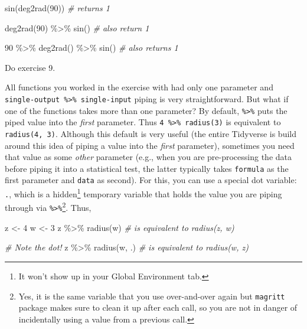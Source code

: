 \documentclass[
]{book}
\newenvironment{Shaded}{\begin{snugshade}}{\end{snugshade}}
\newcommand{\CommentTok}[1]{\textcolor[rgb]{0.56,0.35,0.01}{\textit{#1}}}
\newcommand{\DecValTok}[1]{\textcolor[rgb]{0.00,0.00,0.81}{#1}}
\newcommand{\FunctionTok}[1]{\textcolor[rgb]{0.00,0.00,0.00}{#1}}
\newcommand{\NormalTok}[1]{#1}
\newcommand{\OtherTok}[1]{\textcolor[rgb]{0.56,0.35,0.01}{#1}}
\newcommand{\SpecialCharTok}[1]{\textcolor[rgb]{0.00,0.00,0.00}{#1}}
\begin{document}
\begin{Shaded}
\begin{Highlighting}[]
\FunctionTok{sin}\NormalTok{(}\FunctionTok{deg2rad}\NormalTok{(}\DecValTok{90}\NormalTok{)) }\CommentTok{\# returns 1}

\FunctionTok{deg2rad}\NormalTok{(}\DecValTok{90}\NormalTok{) }\SpecialCharTok{\%\textgreater{}\%} \FunctionTok{sin}\NormalTok{() }\CommentTok{\# also return 1}

\DecValTok{90} \SpecialCharTok{\%\textgreater{}\%} \FunctionTok{deg2rad}\NormalTok{() }\SpecialCharTok{\%\textgreater{}\%} \FunctionTok{sin}\NormalTok{() }\CommentTok{\# also returns 1}
\end{Highlighting}
\end{Shaded}

Do exercise 9.

All functions you worked in the exercise with had only one parameter and \texttt{single-output\ \%\textgreater{}\%\ single-input} piping is very straightforward. But what if one of the functions takes more than one parameter? By default, \texttt{\%\textgreater{}\%} puts the piped value into the \emph{first} parameter. Thus \texttt{4\ \%\textgreater{}\%\ radius(3)} is equivalent to \texttt{radius(4,\ 3)}. Although this default is very useful (the entire Tidyverse is build around this idea of piping a value into the \emph{first} parameter), sometimes you need that value as some \emph{other} parameter (e.g., when you are pre-processing the data before piping it into a statistical test, the latter typically takes \texttt{formula} as the first parameter and \texttt{data} as second). For this, you can use a special dot variable: \texttt{.}, which is a hidden\footnote{It won't show up in your Global Environment tab.} temporary variable that holds the value you are piping through via \texttt{\%\textgreater{}\%}\footnote{Yes, it is the same variable that you use over-and-over again but \texttt{magritt} package makes sure to clean it up after each call, so you are not in danger of incidentally using a value from a previous call.}. Thus,

\begin{Shaded}
\begin{Highlighting}[]
\NormalTok{z }\OtherTok{\textless{}{-}} \DecValTok{4}
\NormalTok{w }\OtherTok{\textless{}{-}} \DecValTok{3}
\NormalTok{z }\SpecialCharTok{\%\textgreater{}\%} \FunctionTok{radius}\NormalTok{(w) }\CommentTok{\# is equivalent to radius(z, w)}

\CommentTok{\# Note the dot!}
\NormalTok{z }\SpecialCharTok{\%\textgreater{}\%} \FunctionTok{radius}\NormalTok{(w, .) }\CommentTok{\# is equivalent to radius(w, z)}
\end{Highlighting}
\end{Shaded}
\end{document}
